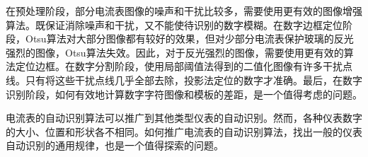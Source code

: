 在预处理阶段，部分电流表图像的噪声和干扰比较多，需要使用更有效的图像增强算法。既保证消除噪声和干扰，又不能使待识别的数字模糊。在数字边框定位阶段，Otsu算法对大部分图像都有较好的效果，但对少部分电流表保护玻璃的反光强烈的图像，Otsu算法失效。因此，对于反光强烈的图像，需要使用更有效的算法定位边框。在数字分割阶段，使用局部阈值法得到的二值化图像有许多干扰点线。只有将这些干扰点线几乎全部去除，投影法定位的数字才准确。最后，在数字识别阶段，如何有效地计算数字字符图像和模板的差距，是一个值得考虑的问题。

电流表的自动识别算法可以推广到其他类型仪表的自动识别。然而，各种仪表数字的大小、位置和形状各不相同。如何推广电流表的自动识别算法，找出一般的仪表自动识别的通用规律，也是一个值得探索的问题。
